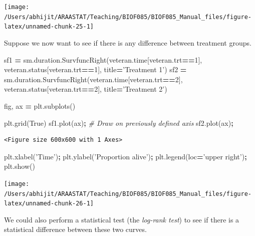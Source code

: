 \documentclass[
  letterpaper,
]{scrbook}
\newenvironment{Shaded}{\begin{snugshade}}{\end{snugshade}}
\newcommand{\CommentTok}[1]{\textcolor[rgb]{0.56,0.35,0.01}{\textit{#1}}}
\newcommand{\DecValTok}[1]{\textcolor[rgb]{0.00,0.00,0.81}{#1}}
\newcommand{\NormalTok}[1]{#1}
\newcommand{\OperatorTok}[1]{\textcolor[rgb]{0.81,0.36,0.00}{\textbf{#1}}}
\newcommand{\StringTok}[1]{\textcolor[rgb]{0.31,0.60,0.02}{#1}}
\newcommand{\VariableTok}[1]{\textcolor[rgb]{0.00,0.00,0.00}{#1}}
\begin{document}
\begin{center}\texttt{[image: /Users/abhijit/ARAASTAT/Teaching/BIOF085/BIOF085\_Manual\_files/figure-latex/unnamed-chunk-25-1]} \end{center}

Suppose we now want to see if there is any difference between treatment groups.

\begin{Shaded}
\begin{Highlighting}[]
\NormalTok{sf1 }\OperatorTok{=}\NormalTok{ sm.duration.SurvfuncRight(veteran.time[veteran.trt}\OperatorTok{==}\DecValTok{1}\NormalTok{], veteran.status[veteran.trt}\OperatorTok{==}\DecValTok{1}\NormalTok{], title}\OperatorTok{=}\StringTok{'Treatment 1'}\NormalTok{)}
\NormalTok{sf2 }\OperatorTok{=}\NormalTok{ sm.duration.SurvfuncRight(veteran.time[veteran.trt}\OperatorTok{==}\DecValTok{2}\NormalTok{], veteran.status[veteran.trt}\OperatorTok{==}\DecValTok{2}\NormalTok{], title}\OperatorTok{=}\StringTok{'Treatment 2'}\NormalTok{)}

\NormalTok{fig, ax }\OperatorTok{=}\NormalTok{ plt.subplots()}

\NormalTok{plt.grid(}\VariableTok{True}\NormalTok{)}
\NormalTok{sf1.plot(ax)}\OperatorTok{;} \CommentTok{# Draw on previously defined axis}
\NormalTok{sf2.plot(ax)}\OperatorTok{;}
\end{Highlighting}
\end{Shaded}

\begin{verbatim}
<Figure size 600x600 with 1 Axes>
\end{verbatim}

\begin{Shaded}
\begin{Highlighting}[]
\NormalTok{plt.xlabel(}\StringTok{'Time'}\NormalTok{)}\OperatorTok{;}
\NormalTok{plt.ylabel(}\StringTok{'Proportion alive'}\NormalTok{)}\OperatorTok{;}
\NormalTok{plt.legend(loc}\OperatorTok{=}\StringTok{'upper right'}\NormalTok{)}\OperatorTok{;}
\NormalTok{plt.show()}
\end{Highlighting}
\end{Shaded}

\begin{center}\texttt{[image: /Users/abhijit/ARAASTAT/Teaching/BIOF085/BIOF085\_Manual\_files/figure-latex/unnamed-chunk-26-1]} \end{center}

We could also perform a statistical test (the \emph{log-rank test}) to see
if there is a statistical difference between these two curves.
\end{document}

